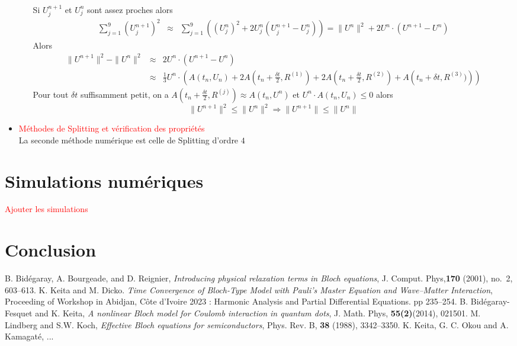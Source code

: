 \documentclass[a4paper]{article}
\begin{document}
\begin{itemize}
\begin{enumerate}
\begin{eqnarray*}
\end{eqnarray*}
Si $U_{j}^{n+1}$ et $U_{j}^{n}$ sont assez proches alors 
\begin{eqnarray*}
\sum_{j=1}^{9} \left(U_{j}^{n+1} \right)^2 &\approx& \sum_{j=1}^{9} \left(\left(U_{j}^{n} \right)^2 + 2 U_{j}^{n}  \left( U_{j}^{n+1}-U_{j}^{n}\right) \right) = \|U^n\|^2 + 2U^n \cdot (U^{n+1}-U^n)
\end{eqnarray*}
Alors 
\begin{eqnarray*}
\|U^{n+1}\|^2 - \|U^n\|^2 &\approx& 2U^n \cdot (U^{n+1}-U^n) \\
                                           &\approx & \frac{1}{3} U^n \cdot \left( A(t_n,U_n)+2A\left(t_n+\frac{\delta t}{2},R^{(1)}\right)+2A\left(t_n+\frac{\delta t}{2},R^{(2)}\right)+A\left(t_n+\delta t,R^{(3)})\right)\right)
\end{eqnarray*}
Pour tout $\delta t$ suffisamment petit, on a $A\left(t_n+\frac{\delta t}{2},R^{(j)}\right)\approx A\left(t_n,U^n\right)$ et $U^n \cdot A(t_n,U_n) \leq 0$ alors 
$$\|U^{n+1}\|^2 \leq  \|U^n\|^2 \Rightarrow \|U^{n+1}\| \leq  \|U^n\|$$
\end{enumerate}
\item \textcolor{red}{Méthodes de Splitting et vérification des propriétés} 
\\La seconde méthode numérique est celle de Splitting d'ordre $4$
\end{itemize}

\section{Simulations numériques}
\textcolor{red}{Ajouter les simulations}


\section{Conclusion}












\begin{thebibliography}{99}
 B. Bidégaray, A. Bourgeade, and D. Reignier, \emph{Introducing physical relaxation terms in Bloch equations}, J. Comput. Phys,\textbf{170} (2001), no.~2, 603--613.
  K. Keita and  M. Dicko. \emph{Time Convergence of Bloch-Type Model with Pauli’s Master Equation and Wave–Matter Interaction}, Proceeding of Workshop in Abidjan, Côte d'Ivoire 2023 : Harmonic Analysis and Partial Differential Equations. pp 235–254. 
 B. Bidégaray-Fesquet and K. Keita, \emph{A nonlinear Bloch model for Coulomb interaction in quantum dots}, J. Math. Phys,   \textbf {55(2)}(2014), 021501. 
 M. Lindberg and S.W. Koch,  \emph{Effective Bloch equations for semiconductors}, Phys. Rev. B, \textbf{38} (1988), 3342–3350.
  K. Keita, G. C. Okou and A. Kamagaté,  ...
\end{thebibliography}
\end{document}
